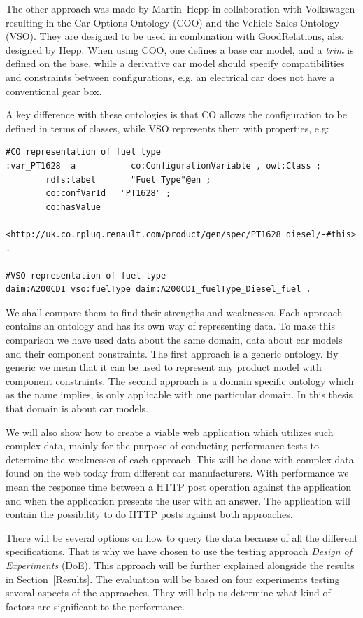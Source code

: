 \documentclass{llncs}
\begin{document}
The other approach was made by Martin~Hepp in collaboration with
Volkswagen resulting in the Car Options Ontology (COO) \cite{COO} and
the Vehicle Sales Ontology (VSO). They are designed to be used in
combination with GoodRelations, also designed by Hepp. When using COO,
one defines a base car model, and a \emph{trim} is defined on the
base, while a derivative car model should specify compatibilities and
constraints between configurations, e.g. an electrical car does not
have a conventional gear box.

A key difference with these ontologies is that CO allows the
configuration to be defined in terms of classes, while VSO
represents them with properties, e.g:
\begin{lstlisting}[basicstyle=\tiny, frame=single]
#CO representation of fuel type
:var_PT1628  a           co:ConfigurationVariable , owl:Class ;
        rdfs:label       "Fuel Type"@en ;
        co:confVarId   "PT1628" ;
        co:hasValue    
	    <http://uk.co.rplug.renault.com/product/gen/spec/PT1628_diesel/-#this> .

#VSO representation of fuel type
daim:A200CDI vso:fuelType daim:A200CDI_fuelType_Diesel_fuel .
\end{lstlisting}



We shall compare them to find their strengths and
weaknesses. Each approach contains an ontology and has its own way of
representing data.  To make this comparison we have used data about
the same domain, data about car models and their component
constraints.  The first approach is a generic ontology. By generic we
mean that it can be used to represent any product model with
component constraints. The second approach is a domain specific
ontology which as the name implies, is only applicable with one
particular domain. In this thesis that domain is about car models.

We will also show how to create a viable web application which
utilizes such complex data, mainly for the purpose of conducting
performance tests to determine the weaknesses of each approach. This
will be done with complex data found on the web today from different
car manufacturers.  With performance we mean the response time between
a HTTP post operation against the application and when
the application presents the user with an answer. The application will
contain the possibility to do HTTP posts against both approaches.

There will be several options on how to query the data because of all
the different specifications.  That is why we have chosen to use the
testing approach \emph{Design of Experiments} (DoE). This approach
will be further explained alongside the results in
Section~\ref{Results}. The evaluation will be based on four
experiments testing several aspects of the approaches. They will help
us determine what kind of factors are significant to the performance.
\end{document}
